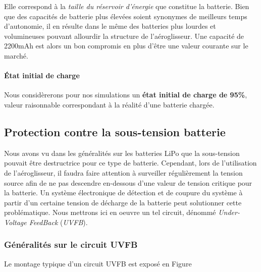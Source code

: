 				Elle correspond à la \textit{taille du réservoir d'énergie} que 
				constitue la batterie. Bien que des capacités de batterie plus
				élevées soient synonymes de meilleurs temps d'autonomie, il en
				résulte dans le même des batteries plus lourdes et volumineuses
				pouvant allourdir la structure de l'aéroglisseur.
				Une capacité de 2200mAh est alors un bon compromis en plus d'être
				une valeur courante sur le marché.
				
				\vspace{-0.5em}
			
				\paragraph{État initial de charge}
			
				Nous considèrerons pour nos simulations un 
				\textbf{état initial de charge de 95\%}, 
				valeur raisonnable correspondant à la réalité d'une 
				batterie chargée.
			
			
			
		\subsection{Protection contre la sous-tension batterie}
			
		Nous avons vu dans les généralités sur les batteries LiPo que la 
		sous-tension pouvait être destructrice pour ce type de batterie. 
		Cependant, lors de l'utilisation de l'aéroglisseur, il faudra faire
		attention à surveiller régulièrement la tension source afin de ne 
		pas descendre en-dessous d'une valeur de tension critique pour la 
		batterie. 
		Un système électronique de détection et de coupure du système à 
		partir d'un certaine tension de décharge de la batterie peut 
		solutionner cette problématique. Nous mettrons ici en oeuvre un tel 
		circuit, dénommé \textit{Under-Voltage FeedBack} (\textit{UVFB}).
			
			\subsubsection{Généralités sur le circuit UVFB} \label{UVBF}
				
			Le montage typique d'un circuit UVFB est exposé en Figure 
				
